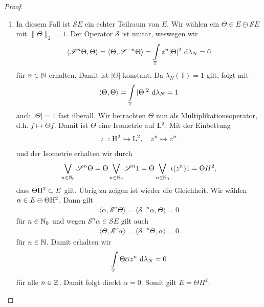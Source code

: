 \begin{proof}
\begin{enumerate}[label=\textbf{(\arabic*)}]
\item
In diesem Fall ist $\mathscr{S}E$ ein echter Teilraum von $E$.
Wir wählen ein $\Theta \in E \ominus \mathscr{S} E$ mit $\| \Theta \|_2 = 1$.
Der Operator $\mathscr{S}$ ist unitär, weswegen wir
\begin{align*}
\langle \mathscr{S}^n \Theta , \Theta \rangle
= 
\langle \Theta, \mathscr{S}^{-n} \Theta \rangle
=
\int \limits_\mathbb{T} z^n | \Theta |^2 \ \text{\rmfamily d} \lambda_N =0 
\end{align*}
für $n \in \mathbb{N}$ erhalten.
Damit ist $|\Theta| $ konstant.
Da $\lambda_N(\mathbb{T}) = 1$ gilt, folgt mit 
\begin{align*}
\langle \Theta, \Theta \rangle 
=
\int \limits_\mathbb{T} | \Theta|^2 \ \text{\rmfamily d} \lambda_N = 1 
\end{align*}
auch $| \Theta  | = 1 $ fast überall.
Wir betrachten $\Theta$ nun als Multiplikationsoperator, d.h. $f \mapsto \Theta f$. 
Damit ist $\Theta$ eine Isometrie auf $\mathrm{L}^2$.
Mit der Einbettung
\begin{align*}
\iota \ : \mathrm{H}^2 \hookrightarrow \mathrm{L}^2, \quad 
z^n \mapsto z^n
\end{align*}
und der Isometrie erhalten wir durch
\begin{align*}
\bigvee_{n \in \mathbb{N}_0} \mathscr{S}^n \Theta
=
\Theta \bigvee_{n \in \mathbb{N}_0} \mathscr{S}^n 1 
=
\Theta \bigvee_{n \in \mathbb{N}_0} \iota(z^n) 1
= \Theta H^2, 
\end{align*}
dass $\Theta \mathrm{H}^2 \subset E$ gilt.
Übrig zu zeigen ist wieder die Gleichheit.
Wir wählen $\alpha \in E \ominus \Theta \mathrm{H}^2$.
Dann gilt 
\begin{align*}
\langle \alpha , \mathscr{S}^n \Theta \rangle
= 
\langle \mathscr{S}^{-n} \alpha , \Theta \rangle
= 0
\end{align*} 
für $n \in \mathbb{N}_0$ und wegen $ \mathscr{S}^n \alpha \in \mathscr{S} E$ gilt auch
\begin{align*}
\langle \Theta, \mathscr{S}^n \alpha \rangle 
=
\langle \mathscr{S}^{-n} \Theta, \alpha \rangle
= 0
\end{align*}
für $n \in \mathbb{N}$.
Damit erhalten wir
\begin{align*}
\int \limits_\mathbb{T} \Theta \overline{\alpha} z^n \ \text{\rmfamily d} \lambda_N = 0
\end{align*}
für alle $n \in \mathbb{Z}$.
Damit folgt direkt $\alpha = 0$.
Somit gilt $E = \Theta H^2$.
\end{enumerate}
\end{proof} 

